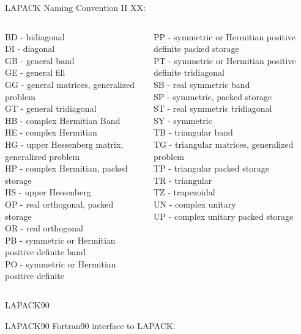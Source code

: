 	\begin{frame}{LAPACK Naming Convention II}
	XX: 
	\vspace{5mm}
	\begin{columns}
		\begin{column}{0.5\textwidth}
		\scriptsize
	BD - bidiagonal \\
	DI - diagonal \\
	GB - general band \\
	GE - general fill \\
	GG - general matrices, generalized problem \\
	GT - general tridiagonal \\
	HB - complex Hermitian Band \\
	HE - complex Hermitian \\
	HG - upper Hessenberg matrix, generalized problem \\
	HP - complex Hermitian, packed storage \\
	HS - upper Hessenberg \\
	OP - real orthogonal, packed storage \\
	OR - real orthogonal \\
	PB - symmetric or Hermitian positive definite band \\
	PO - symmetric or Hermitian positive definite \\
	\end{column}
	\begin{column}{0.5\textwidth}
	\scriptsize
	PP - symmetric or Hermitian positive definite packed storage \\
	PT - symmetric or Hermitian positive definite tridiagonal \\
	SB - real symmetric band \\
	SP - symmetric, packed storage \\
	ST - real symmetric tridiagonal \\
	SY - symmetric \\
	TB - triangular band \\
	TG - triangular matrices, generalized problem \\
	TP - triangular packed storage \\
	TR - triangular \\
	TZ - trapezoidal \\
	UN - complex unitary \\
	UP - complex unitary packed storage \\
		\end{column}
	\end{columns}
	\end{frame}
	\begin{frame}{LAPACK90}
		\begin{block}{LAPACK90}
			Fortran90 interface to LAPACK.
		\end{block}
	\end{frame}